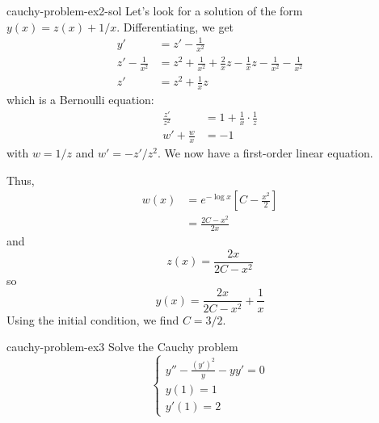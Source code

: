 \documentclass[preview]{standalone}
\begin{document}
\begin{snippetsolution}{cauchy-problem-ex2-sol}{}
    Let's look for a solution of the form \(y(x) = z(x) + 1/x\).
    Differentiating, we get
    \begin{align*}
        y' &= z' - \frac{1}{x^2} \\
        z' - \frac{1}{x^2} &= z^2 + \frac{1}{x^2} + \frac{2}{x}z - \frac{1}{x}z - \frac{1}{x^2} - \frac{1}{x^2} \\
        z' &= z^2 + \frac{1}{x}z
    \end{align*}
    which is a Bernoulli equation:
    \begin{align*}
        \frac{z'}{z^2} &= 1 + \frac{1}{x} \cdot \frac{1}{z} \\
        w' + \frac{w}{x} &= -1
    \end{align*}
    with \(w = 1/z\) and \(w' = -z'/z^2\).
    We now have a first-order linear equation.

    Thus,
    \begin{align*}
        w(x) &= e^{-\log x} \left[
            C - \frac{x^2}{2}
        \right] \\
        &= \frac{2C - x^2}{2x}
    \end{align*}
    and
    \[
        z(x) = \frac{2x}{2C - x^2}
    \]
    so
    \[
        y(x) = \frac{2x}{2C - x^2} + \frac{1}{x}
    \]
    Using the initial condition, we find \(C = 3/2\).
\end{snippetsolution}

\begin{snippetexercise}{cauchy-problem-ex3}{}
    Solve the Cauchy problem
    \[
        \begin{cases}
            y'' - \frac{{(y')}^2}{y} - yy' = 0 \\
            y(1) = 1 \\
            y'(1) = 2
        \end{cases}
    \]
\end{snippetexercise}
\end{document}
